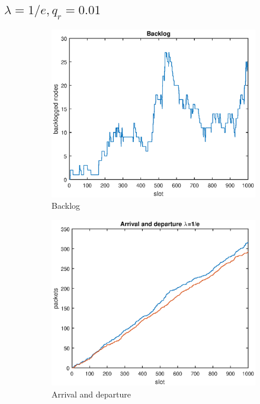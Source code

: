 \documentclass{article}
\begin{document}
\subsection{$\lambda = 1/e, q_r = 0.01$}
\begin{figure}[h]
  \begin{subfigure}{.5\textwidth}
    \includegraphics[width=\textwidth]{figures/backlog.eps}
    \caption{Backlog}
    \label{fig:backlog}
  \end{subfigure}%
  \begin{subfigure}{.5\textwidth}
    \includegraphics[width=\textwidth]{figures/arrival-departure-1.eps}
    \caption{Arrival and departure}
    \label{fig:arrival-departure}
  \end{subfigure}
  \caption{}
\end{figure}
\end{document}
